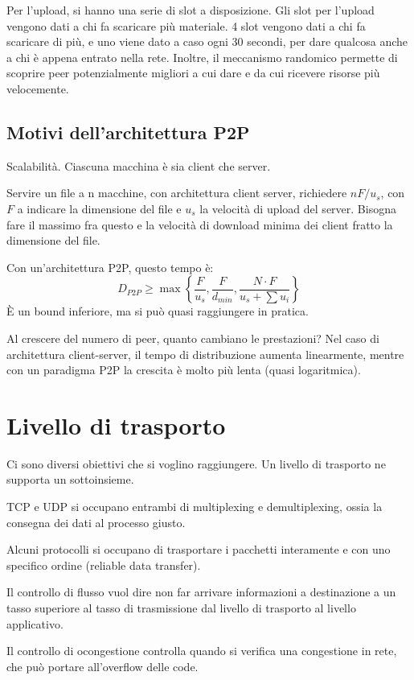 Per l'upload, si hanno una serie di slot a disposizione. Gli slot per l'upload vengono dati a chi fa scaricare pi\`u materiale. 4 slot vengono dati a chi fa scaricare di pi\`u, e uno viene dato a caso ogni 30 secondi, per dare qualcosa anche a chi \`e appena entrato nella rete. Inoltre, il meccanismo randomico permette di scoprire peer potenzialmente migliori a cui dare e da cui ricevere risorse pi\`u velocemente.

\subsection{Motivi dell'architettura P2P}

Scalabilit\`a. Ciascuna macchina \`e sia client che server.

Servire un file a n macchine, con architettura client server, richiedere $n F / u_s$, con $F$ a indicare la dimensione del file e $u_s$ la velocit\`a di upload del server. Bisogna fare il massimo fra questo e la velocit\`a di download minima dei client fratto la dimensione del file.

Con un'architettura P2P, questo tempo \`e:
\[
D_{P2P} \ge \max \left\{ \frac{F}{u_s}, \frac{F}{d_{min}}, \frac{N \cdot F}{u_s + \sum u_i} \right\}
\]
\`E un bound inferiore, ma si pu\`o quasi raggiungere in pratica.

Al crescere del numero di peer, quanto cambiano le prestazioni? Nel caso di architettura client-server, il tempo di distribuzione aumenta linearmente, mentre con un paradigma P2P la crescita \`e molto pi\`u lenta (quasi logaritmica).

\section{Livello di trasporto}

Ci sono diversi obiettivi che si voglino raggiungere. Un livello di trasporto ne supporta un sottoinsieme.

TCP e UDP si occupano entrambi di multiplexing e demultiplexing, ossia la consegna dei dati al processo giusto.

Alcuni protocolli si occupano di trasportare i pacchetti interamente e con uno specifico ordine (reliable data transfer).

Il controllo di flusso vuol dire non far arrivare informazioni a destinazione a un tasso superiore al tasso di trasmissione dal livello di trasporto al livello applicativo.

Il controllo di ocongestione controlla quando si verifica una congestione in rete, che pu\`o portare all'overflow delle code.


